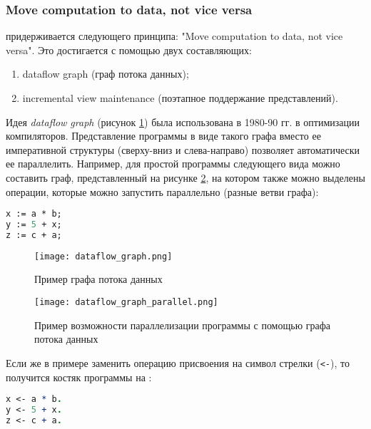 \subsubsection{Move computation to data, not vice versa}
\label{sec:technology:data_to_computation}

\LB придерживается следующего принципа: "Move com\-pu\-ta\-tion to data, not vice versa". Это достигается с помощью двух составляющих:

\begin{enumerate}
  \item dataflow graph (граф потока данных);
  \item incremental view maintenance (поэтапное поддержание представлений).
\end{enumerate}

Идея \emph{dataflow graph} (рисунок \ref{fig:technology:data_to_computation:dataflow_graph}) была использована в 1980-90 гг. в оптимизации компиляторов. Представление программы в виде такого графа вместо ее императивной структуры (сверху-вниз и слева-направо) позволяет автоматически ее параллелить. Например, для простой программы следующего вида можно составить граф, представленный на рисунке \ref{fig:technology:data_to_computation:dataflow_graph_parallel}, на котором также можно выделены операции, которые можно запустить параллельно (разные ветви графа):

\begin{lstlisting}[language=Pascal]
x := a * b;
y := 5 + x;
z := c + a;
\end{lstlisting}

\begin{figure}
	\centering
	\texttt{[image: dataflow\_graph.png]}
	\caption{Пример графа потока данных}
	\label{fig:technology:data_to_computation:dataflow_graph}
\end{figure}

\begin{figure}
	\centering
	\texttt{[image: dataflow\_graph\_parallel.png]}
	\caption{Пример возможности параллелизации программы с помощью графа потока данных}
	\label{fig:technology:data_to_computation:dataflow_graph_parallel}
\end{figure}

Если же в примере заменить операцию присвоения на символ стрелки (\lstinline{<-}), то получится костяк программы на \logiql:

\begin{lstlisting}[language=Prolog]
x <- a * b.
y <- 5 + x.
z <- c + a.
\end{lstlisting}

